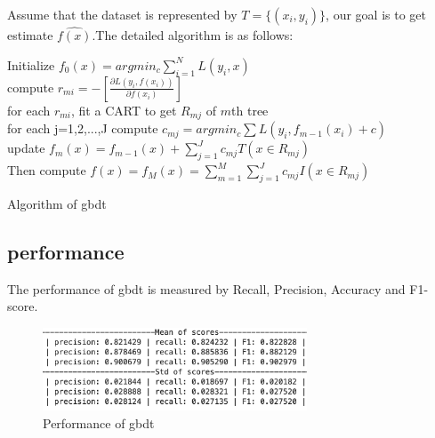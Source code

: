 \documentclass[11pt,en]{elegantpaper}
\begin{document}
Assume that the dataset is represented by $T=\{(x_i, y_i)\}$, our goal is to get estimate $\hat{f(x)}$.The detailed algorithm is as follows:

\begin{algorithm}[H]
\SetAlgoLined
{}
Initialize $f_0(x) = argmin_c \sum_{i=1}^N L(y_i, x)$\\
{
  	{
	compute $r_{mi} = -[\frac{\partial L(y_i, f(x_i))}{\partial f(x_i)}]$\\
	for each $r_{mi}$, fit a CART to get $R_{mj}$ of $m$th tree\\
	for each j=1,2,...,J compute $c_{mj} = argmin_c \sum L(y_i, f_{m-1}(x_i)+c)$\\
	update $f_m(x) = f_{m-1}(x) + \sum_{j=1}^J c_{mj}T(x \in R_{mj})$\\
	}
  Then compute $\hat{f(x)} = f_M(x) = \sum_{m=1}^M \sum_{j=1}^J c_{mj}I (x \in R_{mj})$
}
\caption{Algorithm of gbdt}
\end{algorithm}

\subsection*{performance}
The performance of gbdt is measured by Recall, Precision, Accuracy and F1-score.

\begin{figure}[H]
	\centering
	\includegraphics[width=0.7\textwidth]{image/gbdt_perf.png}
	\caption{Performance of gbdt}
	\label{gbdt1_performance}
\end{figure}


\end{document}
